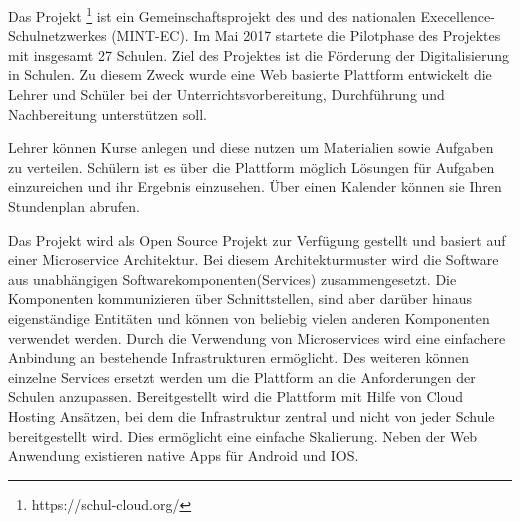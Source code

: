 Das Projekt \schulCloud\footnote{https://schul-cloud.org/} ist ein Gemeinschaftsprojekt des \hpi und des nationalen Execellence-Schulnetzwerkes (MINT-EC). Im Mai 2017 startete die Pilotphase des Projektes mit insgesamt 27 Schulen. Ziel des Projektes ist die Förderung der Digitalisierung in Schulen. 
Zu diesem Zweck wurde eine Web basierte Plattform entwickelt die Lehrer und Schüler bei der Unterrichtsvorbereitung, Durchführung und Nachbereitung unterstützen soll. 

Lehrer können Kurse anlegen und diese nutzen um Materialien sowie Aufgaben zu verteilen. Schülern ist es über die Plattform möglich Lösungen für Aufgaben einzureichen und ihr Ergebnis einzusehen. Über einen Kalender können sie Ihren Stundenplan abrufen.

Das Projekt wird als Open Source Projekt zur Verfügung gestellt und basiert auf einer Microservice Architektur. Bei diesem Architekturmuster wird die Software aus unabhängigen Softwarekomponenten(Services) zusammengesetzt. Die Komponenten kommunizieren über Schnittstellen, sind aber darüber hinaus eigenständige Entitäten und können von beliebig vielen anderen Komponenten verwendet werden. Durch die Verwendung von Microservices wird eine einfachere Anbindung an bestehende Infrastrukturen ermöglicht. Des weiteren können einzelne Services ersetzt werden um die Plattform an die Anforderungen der Schulen anzupassen. Bereitgestellt wird die Plattform mit Hilfe von Cloud Hosting Ansätzen, bei dem die Infrastruktur zentral und nicht von jeder Schule bereitgestellt wird. Dies ermöglicht eine einfache Skalierung. Neben der Web Anwendung existieren native Apps für Android und IOS.


%
%
%
%
%




